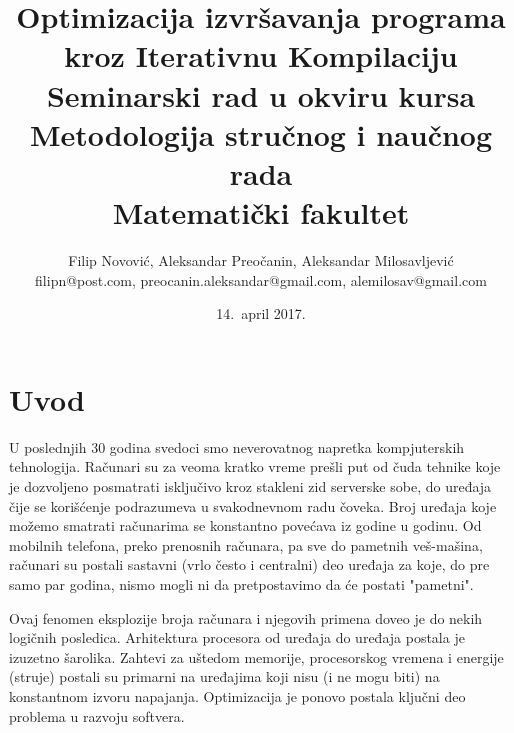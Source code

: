 \documentclass[a4paper]{article}
\begin{document}
\title{Optimizacija izvršavanja programa kroz Iterativnu Kompilaciju\\ \small{Seminarski rad u okviru kursa\\Metodologija stručnog i naučnog rada\\ Matematički fakultet}}

\author{Filip Novović, Aleksandar Preočanin, Aleksandar Milosavljević\\ filipn@post.com, preocanin.aleksandar@gmail.com, alemilosav@gmail.com }
\date{14.~april 2017.}
\maketitle

\tableofcontents

\newpage

\section{Uvod}
\label{sec:uvod}

U poslednjih 30 godina svedoci smo neverovatnog napretka kompjuterskih tehnologija. 
Računari su za veoma kratko vreme prešli put od čuda tehnike koje je dozvoljeno posmatrati isključivo kroz stakleni zid serverske sobe, 
do uređaja čije se korišćenje podrazumeva u svakodnevnom radu čoveka. Broj uređaja koje možemo smatrati računarima se konstantno povećava iz godine u godinu. 
Od mobilnih telefona, preko prenosnih računara, pa sve do pametnih veš-mašina, računari su postali sastavni (vrlo često i centralni) deo uređaja za koje, 
do pre samo par godina, nismo mogli ni da pretpostavimo da će postati "pametni".
\par
Ovaj fenomen eksplozije broja računara i njegovih primena doveo je do nekih logičnih posledica. 
Arhitektura procesora od uređaja do uređaja postala je izuzetno šarolika. Zahtevi za uštedom memorije, procesorskog vremena i energije (struje) postali su primarni na uređajima koji nisu 
(i ne mogu biti) na konstantnom izvoru napajanja. Optimizacija je ponovo postala ključni deo problema u razvoju softvera. 
\end{document}
